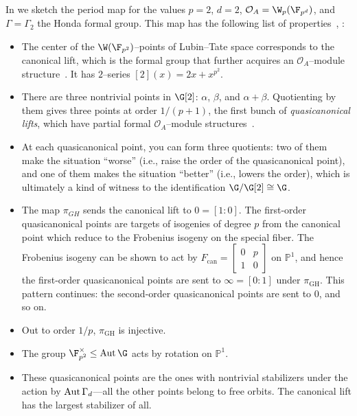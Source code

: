 \begin{remark}
In  we sketch the period map for the values \(p = 2\), \(d = 2\), \(\sheaf O_A = \W_p(\F_{p^d})\), and \(\Gamma = \Gamma_2\) the Honda formal group.  This map has the following list of properties~\cite[Appendix 25]{HopkinsGrossEquivVBs}, \cite{Yu}:
\begin{itemize}
\item The center of the \(\W(\F_{p^2})\)--points of Lubin--Tate space corresponds to the canonical lift, which is the formal group that further acquires an \(\mathcal O_A\)--module structure~\cite{LubinTateOther}.  It has \(2\)--series \([2](x) = 2 x + x^{p^2}\).
\item There are three nontrivial points in \(\G[2]\): \(\alpha\), \(\beta\), and \(\alpha + \beta\).  Quotienting by them gives three points at order \(1/(p+1)\), the first bunch of \textit{quasicanonical lifts}, which have partial formal \(\mathcal O_A\)--module structures~\cite{Gross}.
\item At each quasicanonical point, you can form three quotients: two of them make the situation ``worse'' (i.e., raise the order of the quasicanonical point), and one of them makes the situation ``better'' (i.e., lowers the order), which is ultimately a kind of witness to the identification \(\G / \G[2] \cong \G\).
\item The map \(\pi_{GH}\) sends the canonical lift to \(0 = [1:0]\).  The first-order quasicanonical points are targets of isogenies of degree \(p\) from the canonical point which reduce to the Frobenius isogeny on the special fiber.  The Frobenius isogeny can be shown to act by \(F_{\mathrm{can}} = \left[ \begin{array}{cc} 0 & p \\ 1 & 0 \end{array} \right]\) on \(\mathbb P^1\), and hence the first-order quasicanonical points are sent to \(\infty = [0:1]\) under \(\pi_{\mathrm{GH}}\).  This pattern continues: the second-order quasicanonical points are sent to \(0\), and so on.
\item Out to order \(1/p\), \(\pi_{\mathrm{GH}}\) is injective.
\item The group \(\F_{p^2}^\times \le \Aut \G\) acts by rotation on \(\mathbb P^1\).
\item These quasicanonical points are the ones with nontrivial stabilizers under the action by \(\operatorname{Aut} \Gamma_d\)---all the other points belong to free orbits.  The canonical lift has the largest stabilizer of all.
\end{itemize}
\end{remark}

